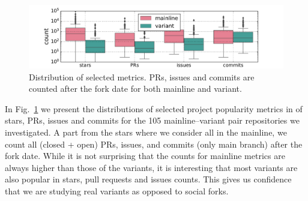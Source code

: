 \begin{figure}[ht]
\begin{center}
    \centering
    \includegraphics[width=\columnwidth]{pdfs/stats.pdf}
    \caption{Distribution of selected metrics. PRs, issues and commits are counted after the fork date for both mainline and variant.}
    \label{fig:stats}
\end{center}
\vspace{-.3cm}
\end{figure}

In Fig.~\ref{fig:stats} we present the distributions of selected project popularity metrics in of stars, PRs, issues and commits for the 105 mainline--variant pair repositories we investigated. A part from the stars where we consider all in the mainline, we count all (closed + open) PRs, issues, and commits (only main branch) after the fork date. While it is not surprising that the counts for mainline metrics are always higher than those of the variants, it is interesting that most variants are also popular in stars, pull requests and issues counts. This gives us confidence that we are studying real variants as opposed to social forks.

